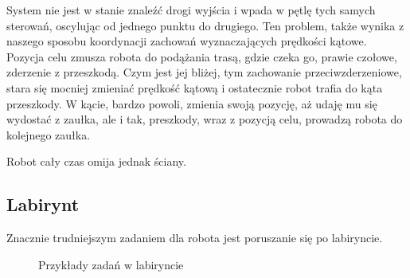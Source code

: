 \documentclass[11pt]{article}
\begin{document}
System nie jest w stanie znaleźć drogi wyjścia i wpada w pętlę tych samych sterowań, oscylując od jednego punktu do drugiego. Ten problem, także wynika z naszego sposobu koordynacji zachowań wyznaczających prędkości kątowe. Pozycja celu zmusza robota do podążania trasą, gdzie czeka go, prawie czołowe, zderzenie z przeszkodą. Czym jest jej bliżej, tym zachowanie przeciwzderzeniowe, stara się mocniej zmieniać prędkość kątową i ostatecznie robot trafia do kąta przeszkody. W kącie, bardzo powoli, zmienia swoją pozycję, aż udaję mu się wydostać z zaułka, ale i tak, preszkody, wraz z pozycją celu, prowadzą robota do kolejnego zaułka.

Robot cały czas omija jednak ściany.

\newpage

\subsection{Labirynt}

Znacznie trudniejszym zadaniem dla robota jest poruszanie się po labiryncie.

\begin{figure}[h!]
	\centering
	
	\hfill
	\hfill
	\hfill
	
	\hfill
	\hfill
	\hfill
	
	\hfill
	\hfill
	\hfill
	
	\hfill
	\hfill
	\hfill
	
	\caption{Przykłady zadań w labiryncie}
\end{figure}
\end{document}
